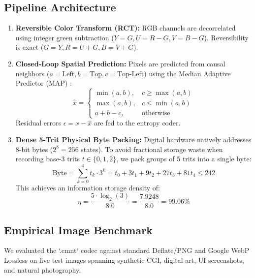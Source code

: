 \documentclass[conference]{IEEEtran}
\begin{document}
\subsection{Pipeline Architecture}
\begin{enumerate}
    \item \textbf{Reversible Color Transform (RCT):} RGB channels are decorrelated using integer green subtraction ($Y = G, U = R - G, V = B - G$). Reversibility is exact ($G = Y, R = U + G, B = V + G$).
    \item \textbf{Closed-Loop Spatial Prediction:} Pixels are predicted from causal neighbors ($a = \text{Left}, b = \text{Top}, c = \text{Top-Left}$) using the Median Adaptive Predictor (MAP) \cite{weinberger2000loco}:
    \begin{equation}
    \hat{x} = \begin{cases} \min(a, b), & c \ge \max(a, b) \\ \max(a, b), & c \le \min(a, b) \\ a + b - c, & \text{otherwise} \end{cases}
    \end{equation}
    Residual errors $\epsilon = x - \hat{x}$ are fed to the entropy coder.
    \item \textbf{Dense 5-Trit Physical Byte Packing:} Digital hardware natively addresses 8-bit bytes ($2^8 = 256$ states). To avoid fractional storage waste when recording base-3 trits $t \in \{0, 1, 2\}$, we pack groups of 5 trits into a single byte:
    \begin{equation}
    \text{Byte} = \sum_{k=0}^{4} t_k \cdot 3^k = t_0 + 3t_1 + 9t_2 + 27t_3 + 81t_4 \le 242
    \end{equation}
    This achieves an information storage density of:
    \begin{equation}
    \eta = \frac{5 \cdot \log_2(3)}{8.0} = \frac{7.9248}{8.0} = \mathbf{99.06\%}
    \end{equation}
\end{enumerate}

\subsection{Empirical Image Benchmark}
We evaluated the `.cmnt` codec against standard Deflate/PNG and Google WebP Lossless on five test images spanning synthetic CGI, digital art, UI screenshots, and natural photography.
\end{document}
